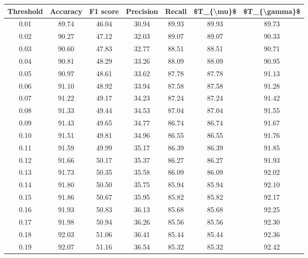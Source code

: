 \begin{tabular}{|c|c|c|c|c|c|c|}
\hline
 Threshold &  Accuracy &  F1 score &  Precision &  Recall &  \$T\_\{\textbackslash mu\}\$ &  \$T\_\{\textbackslash gamma\}\$ \\
\hline
      0.01 &     89.74 &     46.04 &      30.94 &   89.93 &      89.93 &         89.73 \\
      0.02 &     90.27 &     47.12 &      32.03 &   89.07 &      89.07 &         90.33 \\
      0.03 &     90.60 &     47.83 &      32.77 &   88.51 &      88.51 &         90.71 \\
      0.04 &     90.81 &     48.29 &      33.26 &   88.09 &      88.09 &         90.95 \\
      0.05 &     90.97 &     48.61 &      33.62 &   87.78 &      87.78 &         91.13 \\
      0.06 &     91.10 &     48.92 &      33.94 &   87.58 &      87.58 &         91.28 \\
      0.07 &     91.22 &     49.17 &      34.23 &   87.24 &      87.24 &         91.42 \\
      0.08 &     91.33 &     49.44 &      34.53 &   87.04 &      87.04 &         91.55 \\
      0.09 &     91.43 &     49.65 &      34.77 &   86.74 &      86.74 &         91.67 \\
      0.10 &     91.51 &     49.81 &      34.96 &   86.55 &      86.55 &         91.76 \\
      0.11 &     91.59 &     49.99 &      35.17 &   86.39 &      86.39 &         91.85 \\
      0.12 &     91.66 &     50.17 &      35.37 &   86.27 &      86.27 &         91.93 \\
      0.13 &     91.73 &     50.35 &      35.58 &   86.09 &      86.09 &         92.02 \\
      0.14 &     91.80 &     50.50 &      35.75 &   85.94 &      85.94 &         92.10 \\
      0.15 &     91.86 &     50.67 &      35.95 &   85.82 &      85.82 &         92.17 \\
      0.16 &     91.93 &     50.83 &      36.13 &   85.68 &      85.68 &         92.25 \\
      0.17 &     91.98 &     50.94 &      36.26 &   85.56 &      85.56 &         92.30 \\
      0.18 &     92.03 &     51.06 &      36.41 &   85.44 &      85.44 &         92.36 \\
      0.19 &     92.07 &     51.16 &      36.54 &   85.32 &      85.32 &         92.42 \\

\end{tabular}
